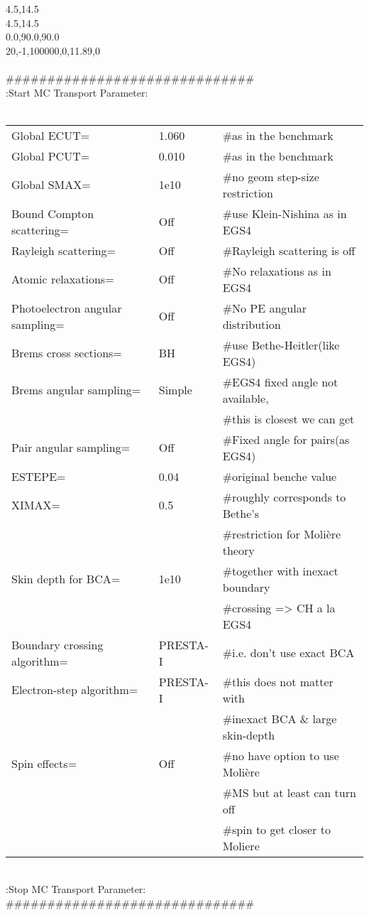 \begin{flushleft}
{4.5,14.5 \\
4.5,14.5 \\
0.0,90.0,90.0 \\
20,-1,100000,0,11.89,0 \\
~\\
\#\#\#\#\#\#\#\#\#\#\#\#\#\#\#\#\#\#\#\#\#\#\#\#\#\#\#\#\#\# \\
:Start MC Transport Parameter: \\
~\\
\begin{tabular}{lll}
Global ECUT= & 1.060 & \#as in the benchmark \\
Global PCUT= & 0.010 & \#as in the benchmark \\
Global SMAX= & 1e10  & \#no geom step-size restriction \\
Bound Compton scattering= & Off & \#use Klein-Nishina as in EGS4\\
Rayleigh scattering=      & Off & \#Rayleigh scattering is off\\
Atomic relaxations= & Off & \#No relaxations as in EGS4 \\
Photoelectron angular sampling= & Off & \#No PE angular distribution \\
Brems cross sections=  &   BH  & \#use Bethe-Heitler(like EGS4) \\
Brems angular sampling= &  Simple & \#EGS4 fixed angle not available,\\
                        & &         \#this is closest we can get \\
Pair angular sampling=  & Off  & \#Fixed angle for pairs(as EGS4)\\
ESTEPE=         & 0.04 & \#original benche value \\
XIMAX=          & 0.5  & \#roughly corresponds to Bethe's \\
& &                      \#restriction for Moli{\`e}re theory \\
Skin depth for BCA= & 1e10 & \#together with inexact boundary \\
& & \#crossing => CH a la EGS4 \\
Boundary crossing algorithm= & PRESTA-I & \#i.e. don't use exact BCA \\
Electron-step algorithm=     & PRESTA-I & \#this does not matter with \\
& & \#inexact BCA \& large skin-depth  \\
Spin effects= &  Off  & \#no have option to use Moli{\`e}re \\
& &                     \#MS but at least can turn off \\
& &                     \#spin to get closer to Moliere  \\
\end{tabular}
~\\
:Stop MC Transport Parameter: \\
\#\#\#\#\#\#\#\#\#\#\#\#\#\#\#\#\#\#\#\#\#\#\#\#\#\#\#\#\#\# }
\end{flushleft}

